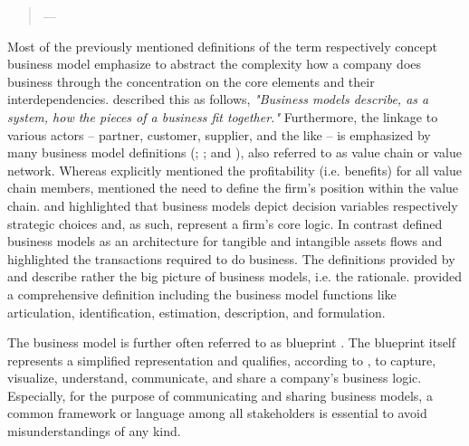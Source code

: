 \begin{quotation}\vspace*{-5pt}{\slshape 
A business model describes the rationale of how an organization creates, delivers and captures value.}
\vspace*{-7pt}
\begin{flushright}
	--- \citealp[p. 14]{Osterwalder2010}
\end{flushright}
\end{quotation}

Most of the previously mentioned definitions of the term respectively concept business model emphasize to abstract the complexity how a company does business through the concentration on the core elements and their interdependencies. \citet[p. 91]{Magretta2002} described this as follows, \textit{"Business models describe, as a system, how the pieces of a business fit together."} Furthermore, the linkage to various actors -- partner, customer, supplier, and the like -- is emphasized by many business model definitions (\citealp[p. 2]{Timmers1998}; \citealp[pp. 533-534]{Chesbrough2002}; and \citealp[p. 202]{Shafer2005}), also referred to as value chain or value network. Whereas \citet[p. 2]{Timmers1998} explicitly mentioned the profitability (i.e. benefits) for all value chain members, \citet[pp. 533-534]{Chesbrough2002} mentioned the need to define the firm's position within the value chain. \citet[p. 727]{Morris2005} and \citet[p. 202]{Shafer2005} highlighted that business models depict decision variables respectively strategic choices and, as such, represent a firm's core logic. In contrast \citet[p. 2]{Timmers1998} defined business models as an architecture for tangible and intangible assets flows and \citet[p. 511]{Amit2001} highlighted the transactions required to do business. The definitions provided by \citet[p. 52]{Johnson2008} and \citet[p. 14]{Osterwalder2010} describe rather the big picture of business models, i.e. the rationale. \citet[p. 533-534]{Chesbrough2002} provided a comprehensive definition including the business model functions like articulation, identification, estimation, description, and formulation.

The business model is further often referred to as blueprint . The blueprint itself represents a simplified representation and qualifies, according to \citet[pp. 11-14]{Osterwalder2005}, to capture, visualize, understand, communicate, and share a company's business logic. Especially, for the purpose of communicating and sharing business models, a common framework or language among all stakeholders is essential to avoid misunderstandings of any kind.


